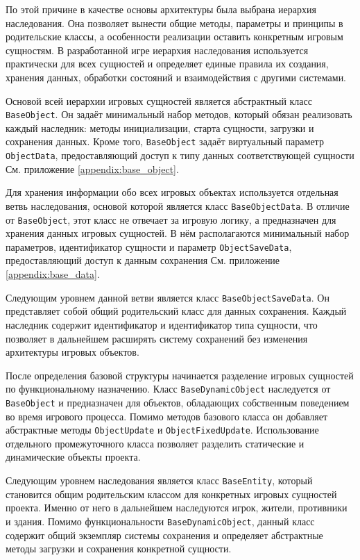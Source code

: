 \documentclass[a4paper,12pt]{report}
\begin{document}
По этой причине в качестве основы архитектуры была выбрана иерархия наследования. Она позволяет вынести общие методы, параметры и принципы в родительские классы, а особенности реализации оставить конкретным игровым сущностям. В разработанной игре иерархия наследования используется практически для всех сущностей и определяет единые правила их создания, хранения данных, обработки состояний и взаимодействия с другими системами.

Основой всей иерархии игровых сущностей является абстрактный класс \texttt{BaseObject}. Он задаёт минимальный набор методов, который обязан реализовать каждый наследник: методы инициализации, старта сущности, загрузки и сохранения данных. Кроме того, \texttt{BaseObject} задаёт виртуальный параметр \texttt{ObjectData}, предоставляющий доступ к типу данных соответствующей сущности См. приложение \ref{appendix:base_object}.

Для хранения информации обо всех игровых объектах используется отдельная ветвь наследования, основой которой является класс \texttt{BaseObjectData}. В отличие от \texttt{BaseObject}, этот класс не отвечает за игровую логику, а предназначен для хранения данных игровых сущностей. В нём располагаются минимальный набор параметров, идентификатор сущности и параметр \texttt{ObjectSaveData}, предоставляющий доступ к данным сохранения См. приложение \ref{appendix:base_data}.

Следующим уровнем данной ветви является класс \texttt{BaseObjectSaveData}. Он представляет собой общий родительский класс для данных сохранения. Каждый наследник содержит идентификатор и идентификатор типа сущности, что позволяет в дальнейшем расширять систему сохранений без изменения архитектуры игровых объектов.

После определения базовой структуры начинается разделение игровых сущностей по функциональному назначению. Класс \texttt{BaseDynamicObject} наследуется от \texttt{BaseObject} и предназначен для объектов, обладающих собственным поведением во время игрового процесса. Помимо методов базового класса он добавляет абстрактные методы \texttt{ObjectUpdate} и \texttt{ObjectFixedUpdate}. Использование отдельного промежуточного класса позволяет разделить статические и динамические объекты проекта.

Следующим уровнем наследования является класс \texttt{BaseEntity}, который становится общим родительским классом для конкретных игровых сущностей проекта. Именно от него в дальнейшем наследуются игрок, жители, противники и здания. Помимо функциональности \texttt{BaseDynamicObject}, данный класс содержит общий экземпляр системы сохранения и определяет абстрактные методы загрузки и сохранения конкретной сущности.
\end{document}
